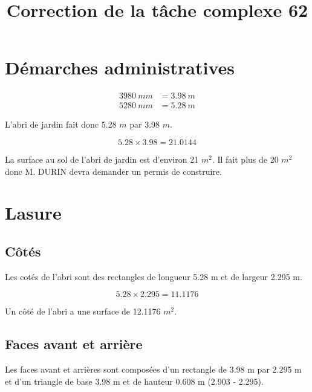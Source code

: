 \documentclass[12pt,a4paper]{article}
\title{Correction de la tâche complexe 62}
\date{}
\begin{document}
	
\maketitle


\section{Démarches administratives}

	\begin{align*}
		3980 \: mm & =  \num{3.98} \: m \\
		5280 \: mm & =  \num{5.28} \: m 		
	\end{align*}

	L'abri de jardin fait donc \num{5.28} $m$ par \num{3.98} $m$.
	
	\begin{equation*}
		\num{5.28} \times \num{3.98} = \num{21.0144}
	\end{equation*}
	
	La surface au sol de l'abri de jardin est d'environ 21 $m^2$. Il fait plus de 20 $m^2$ donc M. DURIN devra demander un permis de construire.


\section{Lasure}

	\subsection*{Côtés}
	
		Les cotés de l'abri sont des rectangles de longueur \num{5.28} m et de largeur \num{2.295} m.
		
		\begin{equation*}
			\num{5.28} \times \num{2.295} = \num{11.1176}
		\end{equation*}
		
		Un côté de l'abri a une surface de \num{12.1176} $m^2$.
		
				
		
	\subsection*{Faces avant et arrière}
	
				
		Les faces avant et arrières sont composées d'un rectangle de \num{3.98} m par  \num{2.295} m et d'un triangle de base \num{3.98} m et de hauteur {0.608} m (\num{2.903} - \num{2.295}).
		
\end{document}
